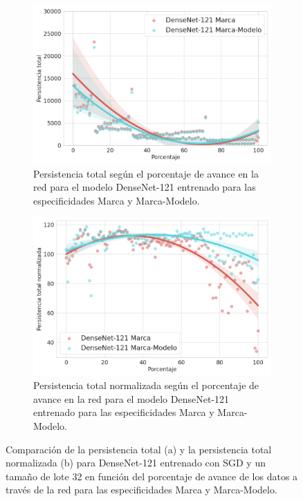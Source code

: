 \begin{figure}[H]
	\centering
	\begin{subfigure}
		{.5\textwidth}
		\centering
		\includegraphics[width=\linewidth]{img/general_densenet.png}
		\caption{Persistencia total según el porcentaje de avance en la red para el
			modelo DenseNet-121 entrenado para las especificidades Marca y Marca-Modelo.}
		\label{fig:densenet-1}
	\end{subfigure}%
	\begin{subfigure}
		{.5\textwidth}
		\centering
		\includegraphics[width=\linewidth]{img/general_densenet_norm.png}
		\caption{Persistencia total normalizada según el porcentaje de avance en la
			red para el modelo DenseNet-121 entrenado para las especificidades Marca y
			Marca-Modelo.}
		\label{fig:densenet-2}
	\end{subfigure}
	\caption{Comparación de la persistencia total (a) y la persistencia total
		normalizada (b) para DenseNet-121 entrenado con SGD y un tamaño de lote 32 en
		función del porcentaje de avance de los datos a través de la red para las
		especificidades Marca y Marca-Modelo.}
	\label{fig:densenet}
\end{figure}

